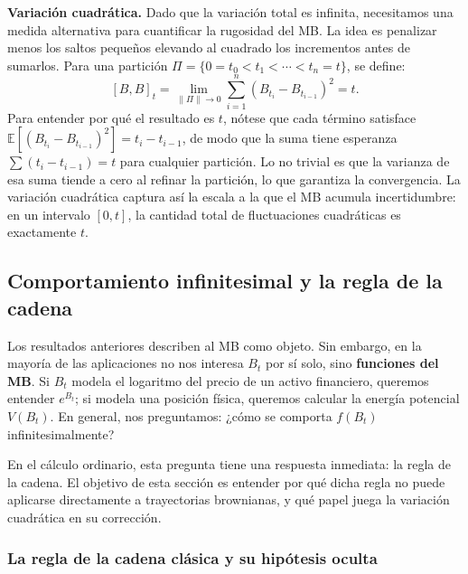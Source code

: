 \documentclass[12pt]{book}
\begin{document}
\textbf{Variación cuadrática.} Dado que la variación total es infinita, necesitamos una medida alternativa para cuantificar la rugosidad del MB. La idea es penalizar menos los saltos pequeños elevando al cuadrado los incrementos antes de sumarlos. Para una partición $\Pi = \{0 = t_0 < t_1 < \cdots < t_n = t\}$, se define:
\[
    [B,B]_t = \lim_{\|\Pi\| \to 0} \sum_{i=1}^n \left(B_{t_i} - B_{t_{i-1}}\right)^2 = t.
\]
Para entender por qué el resultado es $t$, nótese que cada término satisface $\mathbb{E}[(B_{t_i}-B_{t_{i-1}})^2] = t_i - t_{i-1}$, de modo que la suma tiene esperanza $\sum(t_i - t_{i-1}) = t$ para cualquier partición. Lo no trivial es que la varianza de esa suma tiende a cero al refinar la partición, lo que garantiza la convergencia. La variación cuadrática captura así la escala a la que el MB acumula incertidumbre: en un intervalo $[0,t]$, la cantidad total de fluctuaciones cuadráticas es exactamente $t$.

\subsection{Comportamiento infinitesimal y la regla de la cadena}

Los resultados anteriores describen al MB como objeto. Sin embargo, en la mayoría de las aplicaciones no nos interesa $B_t$ por sí solo, sino \textbf{funciones del MB}. Si $B_t$ modela el logaritmo del precio de un activo financiero, queremos entender $e^{B_t}$; si modela una posición física, queremos calcular la energía potencial $V(B_t)$. En general, nos preguntamos: ¿cómo se comporta $f(B_t)$ infinitesimalmente?

En el cálculo ordinario, esta pregunta tiene una respuesta inmediata: la regla de la cadena. El objetivo de esta sección es entender por qué dicha regla no puede aplicarse directamente a trayectorias brownianas, y qué papel juega la variación cuadrática en su corrección.

\subsubsection*{La regla de la cadena clásica y su hipótesis oculta}
\end{document}
